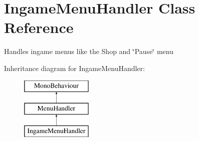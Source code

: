 \hypertarget{class_ingame_menu_handler}{}\section{Ingame\+Menu\+Handler Class Reference}
\label{class_ingame_menu_handler}


Handles ingame menus like the Shop and \char`\"{}\+Pause\char`\"{} menu  


Inheritance diagram for Ingame\+Menu\+Handler\+:\begin{figure}[H]
\begin{center}
\leavevmode
\includegraphics[height=3.000000cm]{class_ingame_menu_handler}
\end{center}
\end{figure}
